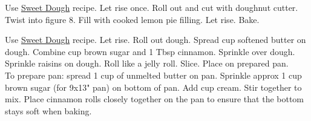 \begin{minipage}{\linewidth}
\end{minipage}\par\begin{minipage}{\linewidth} 

\end{minipage}\par\begin{minipage}{\linewidth} 
Use \hyperlink{sweetdoughlink}{Sweet Dough} recipe. Let rise once. Roll out and cut with doughnut cutter. Twist into figure 8. Fill with cooked lemon pie filling. Let rise. Bake.

\end{minipage}\par\begin{minipage}{\linewidth} 
Use \hyperlink{sweetdoughlink}{Sweet Dough} recipe. Let rise. Roll out dough. Spread  cup softened butter on dough. Combine  cup brown sugar and 1 Tbsp cinnamon. Sprinkle over dough. Sprinkle raisins on dough. Roll like a jelly roll. Slice. Place on prepared pan.\\
To prepare pan: spread 1 cup of unmelted butter on pan. Sprinkle approx 1 cup brown sugar (for 9x13" pan) on bottom of pan. Add  cup cream. Stir together to mix.
Place cinnamon rolls closely together on the pan to ensure that the bottom stays soft when baking.

\end{minipage}\par\begin{minipage}{\linewidth}  


\end{minipage}
